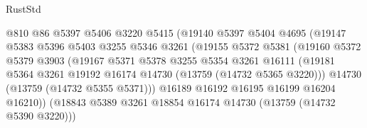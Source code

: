 \begin{lexlean}{RustStd}
\begin{coremodule}
                                    @810
                                    @86
                                    @5397
                                    @5406
                                    @3220
                                    @5415
                                    (@19140
                                      @5397
                                      @5404
                                      @4695
                                      (@19147
                                        @5383
                                        @5396
                                        @5403
                                        @3255
                                        @5346
                                        @3261
                                        (@19155
                                          @5372
                                          @5381
                                          (@19160
                                            @5372
                                            @5379
                                            @3903
                                            (@19167
                                              @5371
                                              @5378
                                              @3255
                                              @5354
                                              @3261
                                              @16111
                                              (@19181
                                                @5364
                                                @3261
                                                @19192
                                                @16174
                                                @14730
                                                (@13759 (@14732 @5365 @3220)))
                                              @14730
                                              (@13759 (@14732 @5355 @5371)))
                                            @16189
                                            @16192
                                            @16195
                                            @16199
                                            @16204
                                            @16210))
                                        (@18843
                                          @5389
                                          @3261
                                          @18854
                                          @16174
                                          @14730
                                          (@13759 (@14732 @5390 @3220)))

\end{coremodule}
\end{lexlean}
